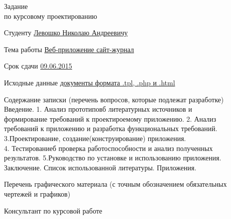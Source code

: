 \center
Задание\\
по курсовому проектированию\\
\medskip
\endcenter
\raggedright
Студенту \underline{Левошко Николаю Андреевичу}\\

\item Тема работы \underline{Веб-приложение сайт-журнал}\\ 
\item Срок сдачи \underline{09.06.2015}
\item Исходные данные \underline{документы формата .tpl, .php и .html}

\item Содержание записки (перечень вопросов, которые подлежат разработке)\\
\underline{\hspace*{16cm}}\hspace*{-16cm}Введение. 1. Анализ прототиповб литературных источников и\\ \underline{\hspace*{16cm}}\hspace*{-16cm}формирование требований к проектироемому приложению. 2. Анализ\\
\underline{\hspace*{16cm}}\hspace*{-16cm} требований к приложению и разработка функциональных требований.\\
\underline{\hspace*{16cm}}\hspace*{-16cm} 3.Проектирование, создание(конструирование) приложения.\\
\underline{\hspace*{16cm}}\hspace*{-16cm} 4. Тестированиеб проверка работоспособности и анализ полученных\\
\underline{\hspace*{16cm}}\hspace*{-16cm} результатов. 5.Руководство по установке и использованию приложения.\\
\underline{\hspace*{16cm}}\hspace*{-16cm} Заключение. Список использованной литературы. Приложения.
\item Перечень графического материала (с точным обозначением обязательных чертежей и графиков)\\
\item Консультант по курсовой работе\\
